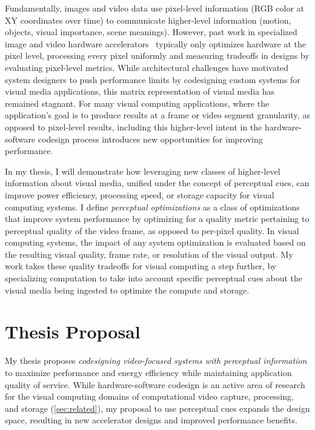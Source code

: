 Fundamentally, images and video data use pixel-level information (RGB color at XY coordinates over time) to communicate higher-level information (motion, objects, visual importance, scene meanings).
However, past work in specialized image and video hardware accelerators~\cite{hauswald2014hybrid, convolution_engine, adams2010frankencamera} typically only optimizes hardware at the pixel level, processing every pixel uniformly and measuring tradeoffs in designs by evaluating pixel-level metrics.
While architectural challenges have motivated system designers to push performance limits by codesigning custom systems for visual media applications, this matrix representation of visual media has remained stagnant.
For many visual computing applications, where the application's goal is to produce results at a frame or video segment granularity, as opposed to pixel-level results, including this higher-level intent in the hardware-software codesign process introduces new opportunities for improving performance.

In my thesis, I will demonstrate how leveraging new classes of higher-level information about visual media, unified under the concept of perceptual cues, can improve power efficiency, processing speed, or storage capacity for visual computing systems.
I define \textit{perceptual optimizations} as a class of optimizations that improve system performance by optimizing for a quality metric pertaining to perceptual quality of the video frame, as opposed to per-pixel quality.
In visual computing systems, the impact of any system optimization is evaluated based on the resulting visual quality, frame rate, or resolution of the visual output.
My work takes these quality tradeoffs for visual computing a step further, by specializing computation to take into account specific perceptual cues about the visual media being ingested to optimize the compute and storage.

\section{Thesis Proposal}
My thesis proposes \emph{codesigning video-focused systems with perceptual information} to maximize performance and energy efficiency while maintaining application quality of service.
While hardware-software codesign is an active area of research for the visual computing domains of computational video capture, processing, and storage (\ref{sec:related}), my proposal to use perceptual cues expands the design space, resulting in new accelerator designs and improved performance benefits.


